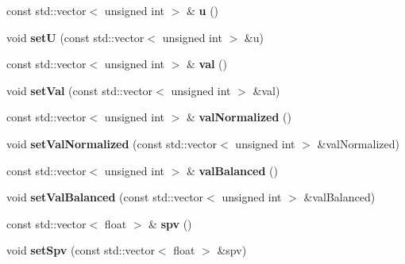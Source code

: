 \begin{DoxyCompactItemize}
\item 
const std\+::vector$<$ unsigned int $>$ \& {\bfseries u} ()\hypertarget{classLaserData_abc1a434a56262a75d130eabd6ca7656d}{}\label{classLaserData_abc1a434a56262a75d130eabd6ca7656d}

\item 
void {\bfseries setU} (const std\+::vector$<$ unsigned int $>$ \&u)\hypertarget{classLaserData_a736f3846c951beaa88f871ec99fef8c6}{}\label{classLaserData_a736f3846c951beaa88f871ec99fef8c6}

\item 
const std\+::vector$<$ unsigned int $>$ \& {\bfseries val} ()\hypertarget{classLaserData_ae030badaffb68af0c9f41f56bfaf9391}{}\label{classLaserData_ae030badaffb68af0c9f41f56bfaf9391}

\item 
void {\bfseries set\+Val} (const std\+::vector$<$ unsigned int $>$ \&val)\hypertarget{classLaserData_a9b00f899e110b2b503108475073b16d6}{}\label{classLaserData_a9b00f899e110b2b503108475073b16d6}

\item 
const std\+::vector$<$ unsigned int $>$ \& {\bfseries val\+Normalized} ()\hypertarget{classLaserData_a26192f23f2611a05c9c79ab3f5b9a134}{}\label{classLaserData_a26192f23f2611a05c9c79ab3f5b9a134}

\item 
void {\bfseries set\+Val\+Normalized} (const std\+::vector$<$ unsigned int $>$ \&val\+Normalized)\hypertarget{classLaserData_ac4fce305a7df92cc2a837bad7e58e350}{}\label{classLaserData_ac4fce305a7df92cc2a837bad7e58e350}

\item 
const std\+::vector$<$ unsigned int $>$ \& {\bfseries val\+Balanced} ()\hypertarget{classLaserData_acb78797723f1e691428a256b9ee0b2fd}{}\label{classLaserData_acb78797723f1e691428a256b9ee0b2fd}

\item 
void {\bfseries set\+Val\+Balanced} (const std\+::vector$<$ unsigned int $>$ \&val\+Balanced)\hypertarget{classLaserData_aecbef6e42ca2eb686264677bbcccc438}{}\label{classLaserData_aecbef6e42ca2eb686264677bbcccc438}

\item 
const std\+::vector$<$ float $>$ \& {\bfseries spv} ()\hypertarget{classLaserData_af6101cbdd7405f2c2361277855df3a5d}{}\label{classLaserData_af6101cbdd7405f2c2361277855df3a5d}

\item 
void {\bfseries set\+Spv} (const std\+::vector$<$ float $>$ \&spv)\hypertarget{classLaserData_a58880371d0b0e2e1df814769debf3dfc}{}\label{classLaserData_a58880371d0b0e2e1df814769debf3dfc}


\end{DoxyCompactItemize}
